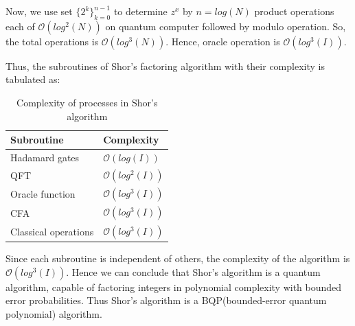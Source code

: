 Now, we use set $ \{2^k\}_{k=0}^{n-1}$ to determine $z^x$ by $n=log(N)$ product operations each of $\mathcal{O}(log^2(N))$ on quantum computer followed by modulo operation. So, the total operations is $\mathcal{O}(log^3(N))$. Hence, oracle operation is  $\mathcal{O}(log^3(I))$.

Thus, the subroutines of Shor's factoring algorithm with their complexity is tabulated as:
\begin{table}
\begin{center}
\begin{tabular}[h!]{|l|l|}
	\hline
	Subroutine & Complexity\\
	\hline
	Hadamard gates	& $\mathcal{O}(log(I))$\\
	QFT		& $\mathcal{O}(log^2(I))$\\
	Oracle function & $\mathcal{O}(log^3(I))$\\
	CFA	 	& $\mathcal{O}(log^3(I))$\\
	Classical operations & $\mathcal{O}(log^3(I))$\\
	\hline
\end{tabular}

 \caption{Complexity of processes in Shor's algorithm}
    \label{tab: Complexity of processes in Shor's algorithm}
\end{center}
\end{table}

Since each subroutine is independent of others, the complexity of the algorithm is $\mathcal{O}(log^3(I))$. Hence we can conclude that Shor's algorithm is a quantum algorithm, capable of factoring integers in polynomial complexity with bounded error probabilities. Thus Shor's algorithm is a \acrshort{BQP}(bounded-error quantum polynomial) algorithm.
